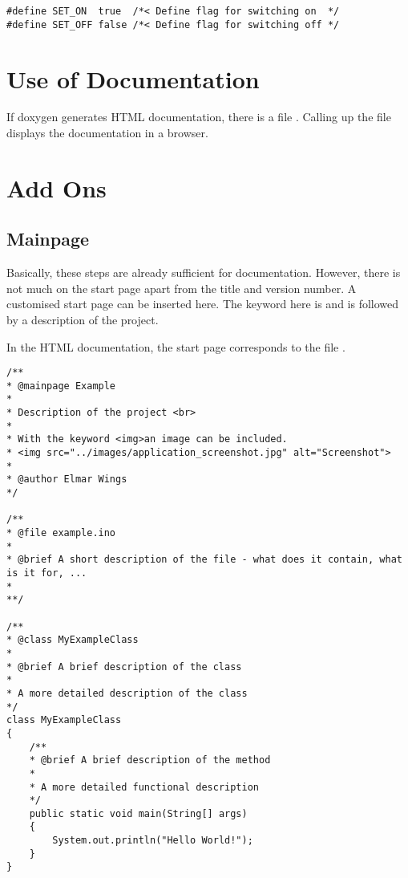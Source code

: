 \begin{verbatim}
#define SET_ON  true  /*< Define flag for switching on  */
#define SET_OFF false /*< Define flag for switching off */
\end{verbatim}


\section{Use of Documentation}

If doxygen generates HTML documentation, there is a file . Calling up the file  displays the documentation in a browser.




\section{Add Ons}


\subsection{Mainpage}


Basically, these steps are already sufficient for documentation. However, there is not much on the start page apart from the title and version number. A customised start page can be inserted here. The keyword here is  and is followed by a description of the project.


In the HTML documentation, the start page corresponds to the file .


\begin{lstlisting}
/**
* @mainpage Example 
*
* Description of the project <br>
*
* With the keyword <img>an image can be included. 
* <img src="../images/application_screenshot.jpg" alt="Screenshot">
*
* @author Elmar Wings
*/

/**
* @file example.ino
*
* @brief A short description of the file - what does it contain, what is it for, ...
*
**/

/**
* @class MyExampleClass
*
* @brief A brief description of the class
*
* A more detailed description of the class
*/
class MyExampleClass
{
	/**
	* @brief A brief description of the method
	*
	* A more detailed functional description
	*/
	public static void main(String[] args)
	{
		System.out.println("Hello World!");
	}
}
\end{lstlisting}








